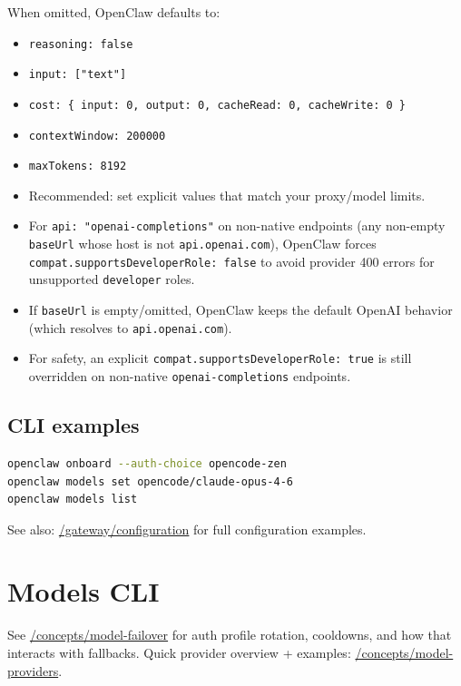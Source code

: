 When omitted, OpenClaw defaults to:
\begin{itemize}
  \item \texttt{reasoning: false}
  \item \texttt{input: ["text"]}
  \item \texttt{cost: \{ input: 0, output: 0, cacheRead: 0, cacheWrite: 0 \}}
  \item \texttt{contextWindow: 200000}
  \item \texttt{maxTokens: 8192}
  \item Recommended: set explicit values that match your proxy/model limits.
  \item For \texttt{api: "openai-completions"} on non-native endpoints (any non-empty \texttt{baseUrl} whose host is not \texttt{api.openai.com}), OpenClaw forces \texttt{compat.supportsDeveloperRole: false} to avoid provider 400 errors for unsupported \texttt{developer} roles.
  \item If \texttt{baseUrl} is empty/omitted, OpenClaw keeps the default OpenAI behavior (which resolves to \texttt{api.openai.com}).
  \item For safety, an explicit \texttt{compat.supportsDeveloperRole: true} is still overridden on non-native \texttt{openai-completions} endpoints.
\end{itemize}


\subsection{CLI examples}


\begin{lstlisting}[language=bash]
openclaw onboard --auth-choice opencode-zen
openclaw models set opencode/claude-opus-4-6
openclaw models list
\end{lstlisting}


See also: \href{/gateway/configuration}{/gateway/configuration} for full configuration examples.


\clearpage

\section{Models CLI}


See \href{/concepts/model-failover}{/concepts/model-failover} for auth profile
rotation, cooldowns, and how that interacts with fallbacks.
Quick provider overview + examples: \href{/concepts/model-providers}{/concepts/model-providers}.


